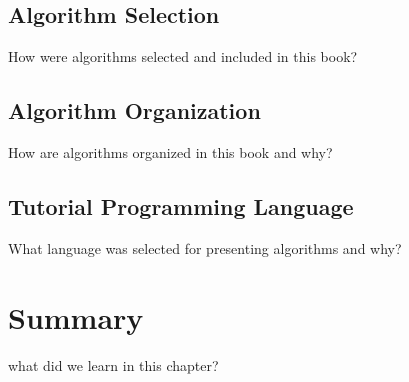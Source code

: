 \subsection{Algorithm Selection}
How were algorithms selected and included in this book?

\subsection{Algorithm Organization}
How are algorithms organized in this book and why?

\subsection{Tutorial Programming Language}
What language was selected for presenting algorithms and why?



\section{Summary}
what did we learn in this chapter?
